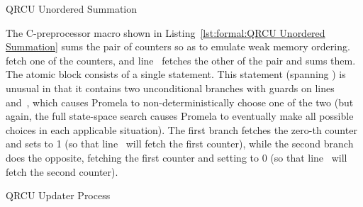 \begin{listing}[htbp]

\caption{QRCU Unordered Summation}
\label{lst:formal:QRCU Unordered Summation}
\end{listing}

\begin{fcvref}
The C-preprocessor macro shown in
Listing~\ref{lst:formal:QRCU Unordered Summation}
sums the pair of counters so as to emulate weak memory ordering.
 fetch one of the counters,
and line~ fetches the other
of the pair and sums them.
The atomic block consists of a single  statement.
This  statement (spanning ) is unusual in that
it contains two unconditional
branches with guards on lines~ and~, which causes Promela to
non-deterministically choose one of the two (but again, the full
state-space search causes Promela to eventually make all possible
choices in each applicable situation).
The first branch fetches the zero-th counter and sets  to 1 (so
that line~ will fetch the first counter), while the second
branch does the opposite, fetching the first counter and setting 
to 0 (so that line~ will fetch the second counter).
\end{fcvref}

\QuickQuizEnd

\begin{listing}[htbp]

\caption{QRCU Updater Process}
\label{lst:formal:QRCU Updater Process}
\end{listing}


